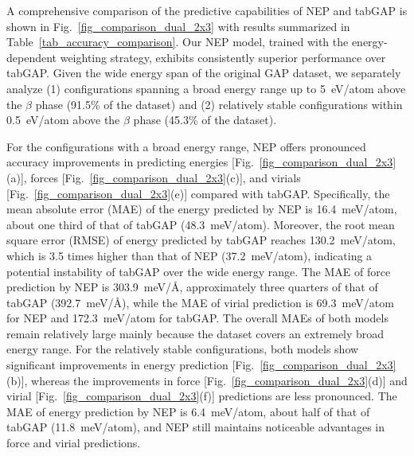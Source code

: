 \documentclass[%
reprint,
superscriptaddress,
 amsmath,amssymb,
 aps,
]{revtex4-2}
\newcommand{\meVA}{meV/$\text{\AA}$}
\begin{document}
A comprehensive comparison of the predictive capabilities of NEP and tabGAP is
shown in Fig.~\ref{fig_comparison_dual_2x3} with results summarized in Table~\ref{tab_accuracy_comparison}. 
Our NEP model, trained with the
energy-dependent weighting strategy, exhibits consistently superior performance
over tabGAP.
Given the wide energy span of the original GAP dataset, we separately analyze
(1) configurations spanning a broad energy range up to 5~eV/atom above the $\beta$ phase 
(91.5\% of the dataset) and (2) relatively stable configurations within 
0.5~eV/atom above the $\beta$ phase (45.3\% of the dataset).

For the configurations with a broad energy range, NEP offers pronounced accuracy
improvements in predicting energies
[Fig.~\ref{fig_comparison_dual_2x3}(a)],
forces
[Fig.~\ref{fig_comparison_dual_2x3}(c)],
and virials
[Fig.~\ref{fig_comparison_dual_2x3}(e)]
compared with tabGAP.
Specifically, the mean absolute error (MAE) of the energy predicted by NEP is
16.4~meV/atom, about one third of that of tabGAP (48.3~meV/atom).
Moreover, the root mean square error (RMSE) of energy predicted by tabGAP
reaches 130.2~meV/atom, which is 3.5 times higher than that of NEP
(37.2~meV/atom), indicating a potential instability of tabGAP over the wide
energy range.
The MAE of force prediction by NEP is 303.9~\meVA, approximately three quarters
of that of tabGAP (392.7~\meVA), while the MAE of virial prediction is
69.3~meV/atom for NEP and 172.3~meV/atom for tabGAP.
The overall MAEs of both models remain relatively large mainly because the dataset
covers an extremely broad energy range.
For the relatively stable configurations, both models show significant improvements in
energy prediction
[Fig.~\ref{fig_comparison_dual_2x3}(b)],
whereas the improvements in force
[Fig.~\ref{fig_comparison_dual_2x3}(d)]
and virial
[Fig.~\ref{fig_comparison_dual_2x3}(f)]
predictions are less pronounced.
The MAE of energy prediction by NEP is 6.4~meV/atom, about half of that of
tabGAP (11.8~meV/atom), and NEP still maintains noticeable advantages in force
and virial predictions.
\end{document}
